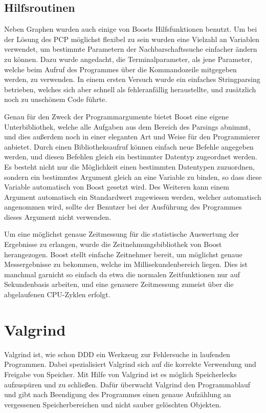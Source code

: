 \subsection{Hilfsroutinen}
Neben Graphen wurden auch einige von Boosts Hilfsfunktionen benutzt. Um bei der Lösung des PCP möglichst flexibel zu sein wurden eine Vielzahl an Variablen verwendet, um bestimmte Parametern der 
Nachbarschaftssuche einfacher ändern zu können. Dazu wurde angedacht, die Terminalparameter, als jene Parameter, welche beim Aufruf des Programmes über die Kommandozeile mitgegeben werden, zu verwenden. 
In einem ersten Versuch wurde ein einfaches Stringparsing betrieben, welches sich aber schnell als fehleranfällig heraustellte, und zusätzlich noch zu unschönem Code führte. 

Genau für den Zweck der Programmargumente bietet Boost eine eigene Unterbibliothek, welche alle Aufgaben aus dem Bereich des Parsings abnimmt, und dies außerdem noch in einer eleganten Art und Weise für
den Programmierer anbietet. Durch einen Bibliotheksaufruf können einfach neue Befehle angegeben werden, und diesen Befehlen gleich ein bestimmter Datentyp zugeordnet werden. Es besteht nicht nur die 
Möglichkeit einen bestimmten Datentypen zuzuordnen, sondern ein bestimmtes Argument gleich an eine Variable zu binden, so dass diese Variable automatisch von Boost gesetzt wird. Des Weiteren kann einem
Argument automatisch ein Standardwert zugewiesen werden, welcher automatisch angenommen wird, sollte der Benutzer bei der Ausführung des Programmes dieses Argument nicht verwenden. 

Um eine möglichst genaue Zeitmessung für die statistische Auswertung der Ergebnisse zu erlangen, wurde die Zeitnehmungsbibliothek von Boost herangezogen. Boost stellt einfache Zeitnehmer bereit, um 
möglichst genaue Messergebnisse zu bekommen, welche im Millisekundenbereich liegen. Dies ist manchmal garnicht so einfach da etwa die normalen Zeitfunktionen nur auf Sekundenbasis arbeiten, und eine 
genauere Zeitmessung zumeist über die abgelaufenen CPU-Zyklen erfolgt.

\section{Valgrind}
Valgrind ist, wie schon DDD ein Werkzeug zur Fehlersuche in laufenden Programmen. Dabei spezialisiert Valgrind sich auf die korrekte Verwendung und Freigabe von Speicher. Mit Hilfe von Valgrind ist es
möglich Speicherlecks aufzuspüren und zu schließen. Dafür überwacht Valgrind den Programmablauf und gibt nach Beendigung des Programmes einen genaue Aufzählung an vergessenen Speicherbereichen und 
nicht sauber gelöschten Objekten. 

